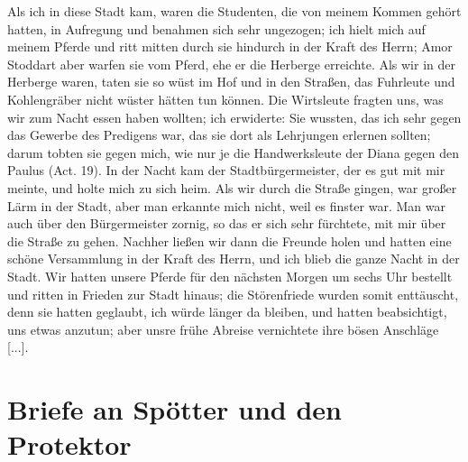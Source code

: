 Als ich in diese Stadt kam, waren die 
Studenten, die von
meinem Kommen gehört hatten, in Aufregung und benahmen
sich sehr ungezogen; ich hielt mich auf meinem Pferde und ritt
mitten durch sie hindurch in der Kraft des Herrn; 
Amor Stoddart
aber warfen sie vom Pferd, ehe er die Herberge erreichte. Als
wir in der Herberge waren, taten sie so wüst im Hof und in den
Straßen, das Fuhrleute und Kohlengräber nicht wüster hätten
tun können. Die Wirtsleute fragten uns, was wir zum Nacht
essen haben wollten; ich erwiderte:  Sie
wussten, das ich sehr gegen das Gewerbe des 
Predigens war, das
sie dort als Lehrjungen erlernen sollten; darum tobten sie gegen
mich, wie nur je die Handwerksleute der Diana gegen den Paulus
(Act. 19). In der Nacht kam der 
Stadtbürgermeister, der es gut mit mir meinte, und 
holte mich zu sich heim. Als wir durch
die Straße gingen, war großer Lärm in der Stadt, aber man
erkannte mich nicht, weil es finster war. Man war auch über
den Bürgermeister zornig, so das er sich sehr fürchtete, mit mir
über die Straße zu gehen. Nachher ließen wir dann die Freunde
holen und hatten eine schöne Versammlung in der Kraft des
Herrn, und ich blieb die ganze Nacht in der Stadt. Wir hatten
unsere Pferde für den nächsten Morgen um sechs Uhr bestellt
und ritten in Frieden zur Stadt hinaus; die Störenfriede wurden
somit enttäuscht, denn sie hatten geglaubt, ich würde länger da
bleiben, und hatten beabsichtigt, uns etwas anzutun; aber unsre
frühe Abreise vernichtete ihre bösen Anschläge [...].

\section{Briefe an Spötter und den Protektor}


